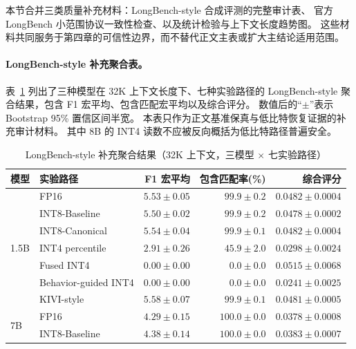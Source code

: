 本节合并三类质量补充材料：LongBench-style 合成评测的完整审计表、
官方 LongBench 小范围协议一致性检查、以及统计检验与上下文长度趋势图。
这些材料共同服务于第四章的可信性边界，而不替代正文主表或扩大主结论适用范围。

\paragraph{LongBench-style 补充聚合表。}
表~\ref{tab:app-longbench-full} 列出了三种模型在 32K 上下文长度下、七种实验路径的
LongBench-style 聚合结果，包含 F1 宏平均、包含匹配宏平均以及综合评分。
数值后的``$\pm$''表示 Bootstrap 95\% 置信区间半宽。
本表只作为正文基准保真与低比特恢复证据的补充审计材料。
其中 8B 的 INT4 读数不应被反向概括为低比特路径普遍安全。

\begin{table}[!htbp]
  \centering
  \begin{threeparttable}
  \caption{LongBench-style 补充聚合结果（32K 上下文，三模型 $\times$ 七实验路径）}
  \label{tab:app-longbench-full}
  \begin{tabular}{lp{3.4cm}rrr}
    \toprule
    \textbf{模型} & \textbf{实验路径} & \textbf{F1 宏平均} & \textbf{包含匹配率(\%)} & \textbf{综合评分} \\
    \midrule
    \multirow{7}{*}{1.5B}
      & FP16                         & $5.53 \pm 0.05$ & $99.9 \pm 0.2$ & $0.0482 \pm 0.0004$ \\
      & INT8-Baseline                & $5.50 \pm 0.02$ & $99.9 \pm 0.2$ & $0.0478 \pm 0.0002$ \\
      & INT8-Canonical               & $5.54 \pm 0.04$ & $99.9 \pm 0.1$ & $0.0482 \pm 0.0004$ \\
      & INT4 percentile              & $2.91 \pm 0.26$ & $45.9 \pm 2.0$ & $0.0298 \pm 0.0024$ \\
      & Fused INT4                   & $0.00 \pm 0.00$ & $0.0 \pm 0.0$  & $0.0515 \pm 0.0068$ \\
      & Behavior-guided INT4         & $0.00 \pm 0.00$ & $0.0 \pm 0.0$  & $0.0241 \pm 0.0025$ \\
      & KIVI-style                   & $5.58 \pm 0.07$ & $99.9 \pm 0.1$ & $0.0481 \pm 0.0005$ \\
    \midrule
    \multirow{7}{*}{7B}
      & FP16                         & $4.29 \pm 0.15$ & $100.0 \pm 0.0$ & $0.0378 \pm 0.0008$ \\
      & INT8-Baseline                & $4.38 \pm 0.14$ & $100.0 \pm 0.0$ & $0.0383 \pm 0.0007$ \\

\end{tabular}
\end{threeparttable}
\end{table}

